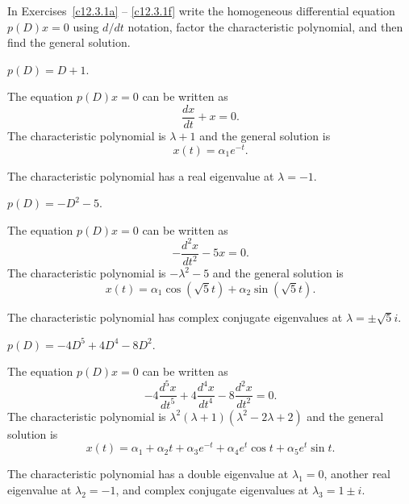 \documentclass{ximera}
\begin{document}
\noindent In Exercises~\ref{c12.3.1a} -- \ref{c12.3.1f} write the 
homogeneous differential equation $p(D)x=0$ using $d/dt$ notation,
factor the characteristic polynomial, and then find the general solution.
\begin{exercise}  \label{c12.3.1a}
$p(D) = D + 1$.

\begin{solution}
\ans The equation $p(D)x = 0$ can be written as
\[
\frac{dx}{dt} + x = 0.
\]
The characteristic polynomial is
$\lambda + 1$
and the general solution is
\[
x(t) = \alpha_1e^{-t}.
\]

\soln The characteristic polynomial has a real eigenvalue at $\lambda = -1$.

\end{solution}
\end{exercise}
\begin{exercise}  \label{c12.3.1b}
$p(D) = -D^2 - 5$.

\begin{solution}
\ans The equation $p(D)x = 0$ can be written as
\[
-\frac{d^2x}{dt^2} - 5x = 0.
\]
The characteristic polynomial is
$-\lambda^2 - 5$
and the general solution is
\[
x(t) = \alpha_1\cos(\sqrt{5}t) + \alpha_2\sin(\sqrt{5}t).
\]

\soln The characteristic polynomial has complex conjugate eigenvalues
at $\lambda = \pm\sqrt{5}i$.


\end{solution}
\end{exercise}

\begin{exercise}  \label{c12.3.1f}
$p(D) = -4D^5 +4D^4 -8D^2$.

\begin{solution}
\ans The equation $p(D)x = 0$ can be written as
\[
-4\frac{d^5x}{dt^5} + 4\frac{d^4x}{dt^4} - 8\frac{d^2x}{dt^2} = 0.
\]
The characteristic polynomial is
$\lambda^2(\lambda + 1)(\lambda^2 - 2\lambda + 2)$
and the general solution is
\[
x(t) = \alpha_1 + \alpha_2 t + \alpha_3e^{-t} +
\alpha_4e^t\cos t + \alpha_5e^t\sin t.
\]

\soln The characteristic polynomial has a double eigenvalue at
$\lambda_1 = 0$, another real eigenvalue at $\lambda_2 = -1$, and complex
conjugate eigenvalues at $\lambda_3 = 1 \pm i$.


\end{solution}
\end{exercise}
\end{document}
